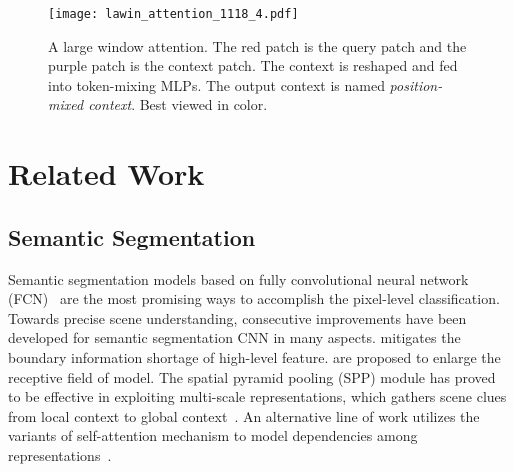 \documentclass[10pt,twocolumn,letterpaper]{article}
\begin{document}
\begin{figure*}[t]
\begin{center}
\texttt{[image: lawin\_attention\_1118\_4.pdf]}
\end{center}
   \caption{A large window attention. The red patch  is the query patch and the purple patch  is the context patch. The context is reshaped and fed into token-mixing MLPs. The output context  is named \textit{position-mixed context}. Best viewed in color. } \vspace{-0.2cm}
\label{fig:lawin attention}
\end{figure*}


\section{Related Work}
\label{sec:2}

\subsection{Semantic Segmentation}
Semantic segmentation models based on fully convolutional neural network (FCN)~\cite{long2015fully} are the most promising ways to accomplish the pixel-level classification. Towards precise scene understanding, consecutive improvements have been developed for semantic segmentation CNN in many aspects. \cite{amirul2017gated, lin2017refinenet, badrinarayanan2017segnet, ronneberger2015u} mitigates the boundary information shortage of high-level feature. \cite{chen2017deeplab, peng2017large, chen2014semantic, yu2015multi} are proposed to enlarge the receptive field of model. The spatial pyramid pooling (SPP) module has proved to be effective in exploiting multi-scale representations, which gathers scene clues from local context to global context~\cite{chen2018encoder, zhao2017pyramid, he2019adaptive, he2019dynamic}. An alternative line of work utilizes the variants of self-attention mechanism to model dependencies among representations~\cite{cao2019gcnet, huang2019ccnet, wang2018non, li2018pyramid, zhao2018psanet, yu2020context, fu2019dual, yin2020disentangled}. 
\end{document}
